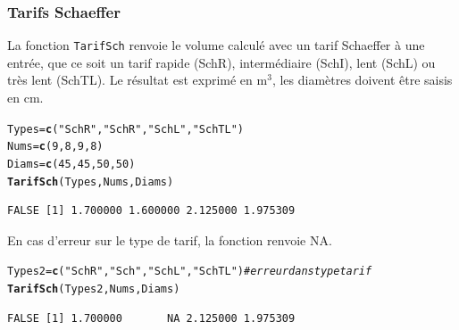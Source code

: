 \documentclass{article}\usepackage[]{graphicx}\usepackage[]{color}
\makeatletter
\newcommand{\hlnum}[1]{\textcolor[rgb]{0.686,0.059,0.569}{#1}}%
\newcommand{\hlstr}[1]{\textcolor[rgb]{0.192,0.494,0.8}{#1}}%
\newcommand{\hlcom}[1]{\textcolor[rgb]{0.678,0.584,0.686}{\textit{#1}}}%
\newcommand{\hlstd}[1]{\textcolor[rgb]{0.345,0.345,0.345}{#1}}%
\newcommand{\hlkwb}[1]{\textcolor[rgb]{0.69,0.353,0.396}{#1}}%
\newcommand{\hlkwd}[1]{\textcolor[rgb]{0.737,0.353,0.396}{\textbf{#1}}}%
\newenvironment{kframe}{%
 \def\at@end@of@kframe{}%
 \ifinner\ifhmode%
  \def\at@end@of@kframe{\end{minipage}}%
  \begin{minipage}{\columnwidth}%
 \fi\fi%
 \def\FrameCommand##1{\hskip\@totalleftmargin \hskip-\fboxsep
 \colorbox{shadecolor}{##1}\hskip-\fboxsep
     \hskip-\linewidth \hskip-\@totalleftmargin \hskip\columnwidth}%
 \MakeFramed {\advance\hsize-\width
   \@totalleftmargin\z@ \linewidth\hsize
   \@setminipage}}%
 {\par\unskip\endMakeFramed%
 \at@end@of@kframe}
\newenvironment{knitrout}{}{} %
\makeatother
\begin{document}
\subsubsection{Tarifs Schaeffer}
La fonction \texttt{TarifSch} renvoie le volume calculé avec un tarif Schaeffer à une entrée, que ce soit un tarif rapide (SchR), intermédiaire (SchI), lent (SchL) ou très lent (SchTL). Le résultat est exprimé en m$^3$, les diamètres doivent être saisis en cm.
\begin{knitrout}\small
{}\color{fgcolor}\begin{kframe}
\begin{alltt}
\hlstd{Types} \hlkwb{=} \hlkwd{c}\hlstd{(}\hlstr{"SchR"}\hlstd{,}\hlstr{"SchR"}\hlstd{,}\hlstr{"SchL"}\hlstd{,}\hlstr{"SchTL"}\hlstd{)}
\hlstd{Nums} \hlkwb{=} \hlkwd{c}\hlstd{(}\hlnum{9}\hlstd{,}\hlnum{8}\hlstd{,}\hlnum{9}\hlstd{,}\hlnum{8}\hlstd{)}
\hlstd{Diams} \hlkwb{=} \hlkwd{c}\hlstd{(}\hlnum{45}\hlstd{,}\hlnum{45}\hlstd{,}\hlnum{50}\hlstd{,}\hlnum{50}\hlstd{)}
\hlkwd{TarifSch}\hlstd{(Types,Nums,Diams)}
\end{alltt}
\begin{verbatim}
FALSE [1] 1.700000 1.600000 2.125000 1.975309
\end{verbatim}
\end{kframe}
\end{knitrout}

En cas d'erreur sur le type de tarif, la fonction renvoie NA.
\begin{knitrout}\small
{}\color{fgcolor}\begin{kframe}
\begin{alltt}
\hlstd{Types2} \hlkwb{=} \hlkwd{c}\hlstd{(}\hlstr{"SchR"}\hlstd{,}\hlstr{"Sch"}\hlstd{,}\hlstr{"SchL"}\hlstd{,}\hlstr{"SchTL"}\hlstd{)} \hlcom{# erreur dans type tarif}
\hlkwd{TarifSch}\hlstd{(Types2,Nums,Diams)}
\end{alltt}
\begin{verbatim}
FALSE [1] 1.700000       NA 2.125000 1.975309
\end{verbatim}
\end{kframe}
\end{knitrout}
\end{document}
